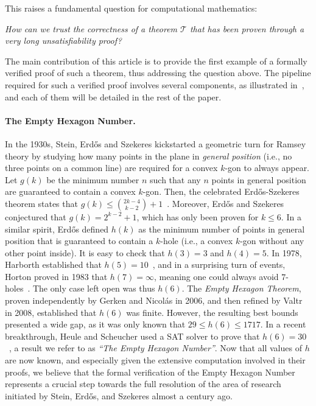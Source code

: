 This raises a fundamental question for computational mathematics:
\begin{center}
  \emph{How can we trust the correctness of a theorem $\mathcal{T}$ that has been proven through a very long unsatisfiability proof?}
\end{center}

The main contribution of this article is to provide the first example of a formally verified proof of such a theorem, thus addressing the question above.
The pipeline required for such a verified proof involves several components, as illustrated in~, and each of them will be detailed in the rest of the paper.

\paragraph{The Empty Hexagon Number.}
In the 1930s, Stein, Erd\H{o}s and Szekeres kickstarted a geometric turn for Ramsey theory by studying how many points in the plane in \emph{general position} (i.e., no three points on a common line) are required for a convex $k$-gon to always appear. Let $g(k)$ be the minimum number $n$ such that any $n$ points in general position are guaranteed to contain a convex $k$-gon. Then, the celebrated Erd\H{o}s-Szekeres theorem states that $g(k) \leq \binom{2k-4}{k-2} + 1$~\cite{erdosCombinatorialProblemGeometry2009}. Moreover, Erd\H{o}s and Szekeres conjectured that $g(k) = 2^{k-2} + 1$, which has only been proven for $k \leq 6$. In a similar spirit, Erd\H{o}s defined $h(k)$ as the minimum number of points in general position that is guaranteed to contain a $k$-hole (i.e., a convex $k$-gon without any other point inside).
It is easy to check that $h(3) = 3$ and $h(4) = 5$. In 1978, Harborth established that $h(5) = 10$~\cite{Harborth1978}, and in a surprising turn of events, Horton proved in 1983 that $h(7) = \infty$, meaning one could always avoid $7$-holes~\cite{hortonSetsNoEmpty1983}. 
The only case left open was thus $h(6)$. The \emph{Empty Hexagon Theorem}, proven independently by Gerken and Nicolás in 2006, and then refined by Valtr in 2008, established that $h(6)$ was finite. 
However, the resulting best bounds presented a wide gap, as it was only known that $29 \leq h(6) \leq 1717$. In a recent breakthrough, Heule and Scheucher used a SAT solver to prove that $h(6) = 30$~\cite{emptyHexagonNumber}, a result we refer to as \emph{``The Empty Hexagon Number''}. Now that all values of $h$ are now known, and especially given the extensive computation involved in their proofs, we believe that the formal verification of the Empty Hexagon Number represents a crucial step towards the full resolution of the area of research initiated by Stein, Erd\H{o}s, and Szekeres almost a century ago.

